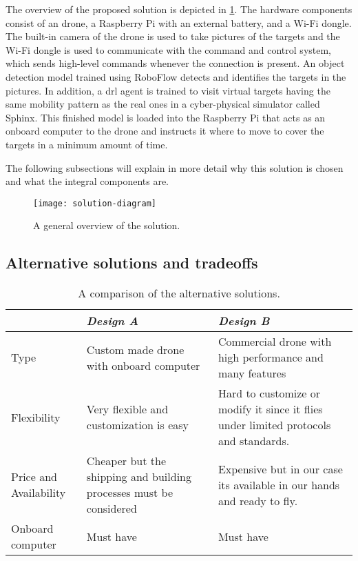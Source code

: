 \documentclass[../main.tex]{subfiles}
\begin{document}
	
The overview of the proposed solution is depicted in 
\cref{fig:solution-overview}. 
The hardware components consist of an \anafi drone,
a Raspberry Pi with an external battery, and a Wi-Fi
dongle. The built-in camera of the drone is used to
take pictures of the targets and the Wi-Fi dongle
is used to communicate with the command and control
system, which sends high-level commands whenever the
connection is present. An object detection model trained
using RoboFlow detects and identifies the targets in the
pictures. In addition, a \gls{drl} agent is trained to
visit virtual targets having the same mobility pattern as the
real ones in a cyber-physical simulator called Sphinx.
This finished model is loaded into the Raspberry Pi that acts
as an onboard computer to the \anafi drone and instructs
it where to move to cover the targets in a minimum amount
of time.

The following subsections will
explain in more detail why this solution is chosen
and what the integral components are.

\begin{figure}[tbp]
	\centering
	\texttt{[image: solution-diagram]}
	\caption{A general overview of the solution.}
	\label{fig:solution-overview}
\end{figure}

\subsection{Alternative solutions and tradeoffs}

\begin{table}[H]
    \centering
    \caption{A comparison of the alternative solutions.}
    \label{tab:alt-solutions}
    \begin{tabular}{ p{4cm} p{6cm} p{6cm} }
        \toprule
        \textit{} & \textit{Design A} & \textit{Design B}\\ \midrule
        Type  & Custom made drone with onboard computer & Commercial drone with high performance and many features    \\
        Flexibility & Very flexible and customization is easy & Hard to customize or modify it since it flies under limited protocols and standards. \\

        Price and Availability & Cheaper but the shipping and building processes must be considered & Expensive but in our case its available in our hands and ready to fly.   \\

        Onboard computer & Must have & Must have \\
        \bottomrule
    \end{tabular}
\end{table} 
\end{document}
